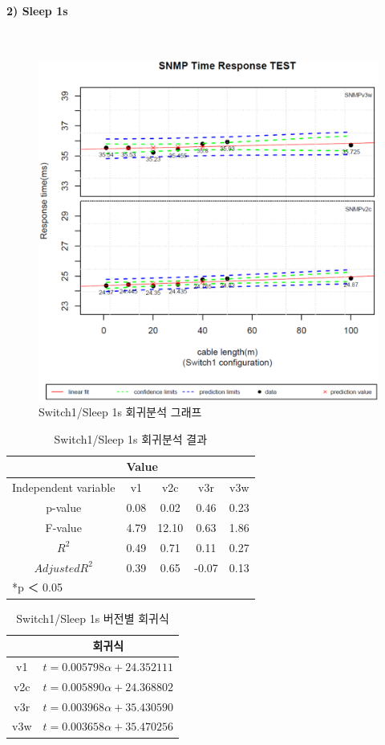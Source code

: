 \documentclass[11pt
  , a4paper
  , article
  , oneside
]{memoir}
\begin{document}
\clearpage
\paragraph{2) Sleep 1s}
   　
\begin{figure}[h!]
  \centering
  \includegraphics[width=0.5 \textwidth]{./images/s1s1.eps}
  \caption{Switch1/Sleep 1s 회귀분석 그래프}
\end{figure}


\begin{table}[!htb]
\begin{center}
\begin{tabular}{c|c|c|c|c}\hline
& \multicolumn{4}{l}{Value} \\ \hline
Independent variable & v1 & v2c & v3r & v3w \\ \hline\hline
p-value& 0.08 & 0.02 & 0.46 & 0.23 \\ \hline
F-value& 4.79 & 12.10& 0.63 & 1.86 \\ \hline
$  R^2  $ & 0.49 & 0.71 & 0.11 & 0.27 \\\hline
$ Adjusted R^2 $ & 0.39 & 0.65 & -0.07 & 0.13 \\\hline 
\multicolumn{5}{l}{*p ＜ 0.05} \\ \hline
\end{tabular}
\caption{Switch1/Sleep 1s 회귀분석 결과}
\end{center}
\end{table} 


\begin{table}[!htb]
\begin{center}
\begin{tabular}{c|c}\hline
 & 회귀식  \\ \hline\hline
v1 &  $ t=0.005798\alpha + 24.352111 $  \\ 
v2c & $ t=0.005890\alpha + 24.368802 $ \\ 
v3r & $ t=0.003968\alpha + 35.430590 $ \\ 
v3w & $ t=0.003658\alpha + 35.470256 $  \\ \hline
\end{tabular}
\caption{Switch1/Sleep 1s 버전별 회귀식}
\end{center}
\end{table} 
\end{document}
